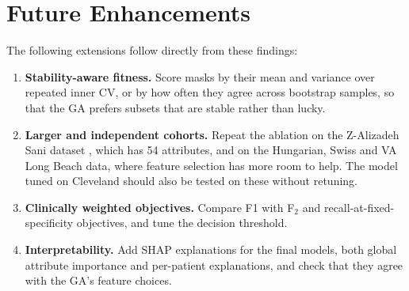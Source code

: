 \documentclass[MTech]{ugthesis}
\begin{document}
\section{Future Enhancements}
The following extensions follow directly from these findings:
\begin{enumerate}
\item \textbf{Stability-aware fitness.} Score masks by their mean and variance over repeated inner CV, or by how often they agree across bootstrap samples, so that the GA prefers subsets that are stable rather than lucky.
\item \textbf{Larger and independent cohorts.} Repeat the ablation on the Z-Alizadeh Sani dataset \citep{alizadehsani2013}, which has 54 attributes, and on the Hungarian, Swiss and VA Long Beach data, where feature selection has more room to help. The model tuned on Cleveland should also be tested on these without retuning.
\item \textbf{Clinically weighted objectives.} Compare F1 with F$_2$ and recall-at-fixed-specificity objectives, and tune the decision threshold.
\item \textbf{Interpretability.} Add SHAP explanations \citep{lundberg2017shap} for the final models, both global attribute importance and per-patient explanations, and check that they agree with the GA's feature choices.
\end{enumerate}

\begin{singlespace}
  
\end{singlespace}
\appendix
\end{document}
